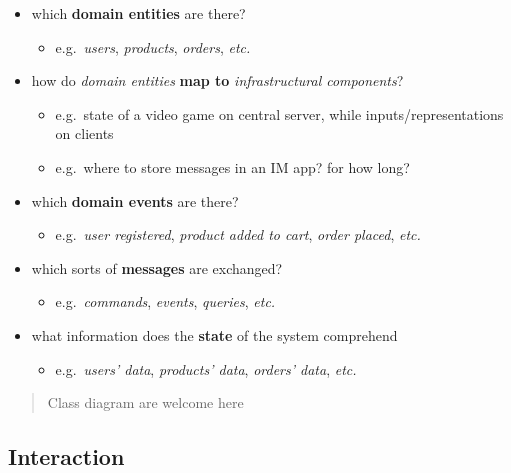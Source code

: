 \documentclass{scrartcl}
\begin{document}
\begin{itemize}
  \item which \textbf{domain entities} are there?

  \begin{itemize}
    \item e.g.~\emph{users}, \emph{products}, \emph{orders}, \emph{etc.}
  \end{itemize}
  \item how do \emph{domain entities} \textbf{map to} \emph{infrastructural
  components}?

  \begin{itemize}
    \item e.g.~state of a video game on central server, while
    inputs/representations on clients
    \item e.g.~where to store messages in an IM app? for how long?
  \end{itemize}
  \item which \textbf{domain events} are there?

  \begin{itemize}
    \item e.g.~\emph{user registered}, \emph{product added to cart},
    \emph{order placed}, \emph{etc.}
  \end{itemize}
  \item which sorts of \textbf{messages} are exchanged?

  \begin{itemize}
    \item e.g.~\emph{commands}, \emph{events}, \emph{queries}, \emph{etc.}
  \end{itemize}
  \item what information does the \textbf{state} of the system comprehend

  \begin{itemize}
    \item e.g.~\emph{users' data}, \emph{products' data}, \emph{orders' data},
    \emph{etc.}
  \end{itemize}
\end{itemize}

\begin{quote}
Class diagram are welcome here
\end{quote}

\subsection{Interaction}\label{interaction}
\end{document}
